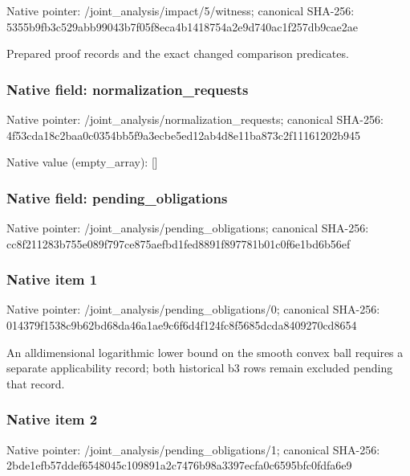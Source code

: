 \documentclass[10pt,a4paper]{article}
\begin{document}
Native pointer: /joint\_analysis/impact/5/witness; canonical SHA-256: 5355b9fb3c529abb99043b7f\allowbreak{}05f8eca4b1418754a2e9d740\allowbreak{}ac1f257db9cae2ae


Prepared proof records and the exact changed comparison predicates.


\subsubsection{Native field: normalization\_requests}


Native pointer: /joint\_analysis/normalization\_requests; canonical SHA-256: 4f53cda18c2baa0c0354bb5f\allowbreak{}9a3ecbe5ed12ab4d8e11ba87\allowbreak{}3c2f11161202b945



Native value (empty\_array): []



\subsubsection{Native field: pending\_obligations}


Native pointer: /joint\_analysis/pending\_obligations; canonical SHA-256: cc8f211283b755e089f797ce\allowbreak{}875aefbd1fed8891f897781b\allowbreak{}01c0f6e1bd6b56ef



\subsubsection{Native item 1}


Native pointer: /joint\_analysis/pending\_obligations/0; canonical SHA-256: 014379f1538c9b62bd68da46\allowbreak{}a1ae9c6f6d4f124fc8f5685d\allowbreak{}cda8409270cd8654


An alldimensional logarithmic lower bound on the smooth convex ball requires a separate applicability record; both historical b3 rows remain excluded pending that record.


\subsubsection{Native item 2}


Native pointer: /joint\_analysis/pending\_obligations/1; canonical SHA-256: 2bde1efb57ddef6548045c10\allowbreak{}9891a2c7476b98a3397ecfa0\allowbreak{}c6595bfc0fdfa6e9
\end{document}
